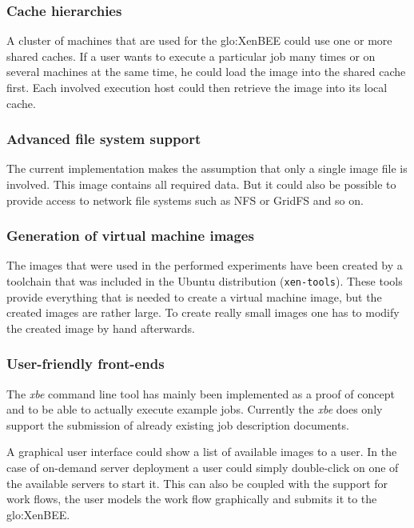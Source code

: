 \subsubsection{Cache hierarchies}

A cluster of machines that are used for the \gls{glo:XenBEE} could use one
or more shared  caches. If a user wants to execute  a particular job many
times or  on several machines  at the same  time, he could load  the image
into  the shared  cache first.   Each involved  execution host  could then
retrieve the image into its local cache.

\subsubsection{Advanced file system support}

The current implementation  makes the assumption that only  a single image
file is  involved. This  image contains all  required data.  But  it could
also be possible to provide access  to network file systems such as NFS or
GridFS and so on.

\subsubsection{Generation of virtual machine images}

The images that  were used in the performed  experiments have been created
by   a  toolchain   that   was  included   in   the  Ubuntu   distribution
(\texttt{xen-tools}).  These  tools provide  everything that is  needed to
create  a  virtual  machine  image,  but the  created  images  are  rather
large. To create  really small images one has to  modify the created image
by hand afterwards.

\subsubsection{User-friendly front-ends}

The \emph{xbe} command line tool has mainly been implemented as a proof of
concept and  to be  able to actually  execute example jobs.  Currently the
\emph{xbe}  does  only support  the  submission  of  already existing  job
description documents.

A graphical  user interface could  show a list  of available images  to a
user.  In  the case  of on-demand server  deployment a user  could simply
double-click on one of the available servers to start it. This can also be
coupled with the support for work flows, \ie the user models the work flow
graphically and submits it to the \gls{glo:XenBEE}.

